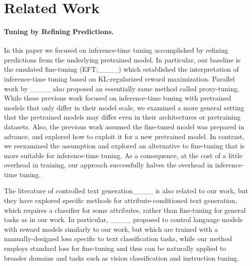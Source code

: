 \section{Related Work}
%

\paragraph{Tuning by Refining Predictions.}
In this paper we focused on inference-time tuning accomplished by refining predictions from the underlying pretrained model.
In particular, our baseline is the emulated fine-tuning (EFT;____) which established the interpretation of inference-time tuning based on KL-regularized reward maximization.
Parallel work by ____ also proposed an essentially same method called proxy-tuning.
While these previous work focused on inference-time tuning with pretrained models that only differ in their model scale, we examined a more general setting that the pretrained models may differ even in their architectures or pretraining datasets.
Also, the previous work assumed the fine-tuned model was prepared in advance, and explored how to exploit it for a new pretrained model.
In contrast, we reexamined the assumption  and explored an alternative to fine-tuning that is more suitable for inference-time tuning.
As a consequence, at the cost of a little overhead in training, our approach successfully halves the overhead in inference-time tuning.
%

The literature of controlled text generation____ is also related to our work, but they have explored specific methods for attribute-conditioned text generation, which requires a classifier for some attributes, rather than fine-tuning for general tasks as in our work.
In particular, ____ proposed to control language models with reward models similarly to our work, but which are trained with a manually-designed loss specific to text classification tasks, while our method employs  standard loss for fine-tuning and thus can be naturally applied to broader domains and tasks such as vision classification and instruction tuning.

\vspace{-0.3cm}

